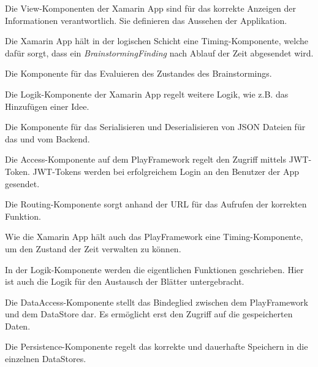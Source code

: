 \begin{description}[leftmargin=!,labelwidth=\widthof{\bfseries AppStateMachineComponent}]
	
	\item[ViewComponent] Die View-Komponenten der Xamarin App sind für das korrekte Anzeigen der Informationen verantwortlich. Sie definieren das Aussehen der Applikation.
	
	\item[AppTimingComponent] Die Xamarin App hält in der logischen Schicht eine Timing-Komponente, welche dafür sorgt, dass ein 
	\textit{BrainstormingFinding} nach Ablauf der Zeit abgesendet wird.
	
	\item[AppStateMachineComponent] Die Komponente für das Evaluieren des Zustandes des Brainstormings.
	
	\item[AppLogicComponent] Die Logik-Komponente der Xamarin App regelt weitere Logik, wie z.B. das Hinzufügen einer Idee.
	
	\item[AppDataAccessComponent] Die Komponente für das Serialisieren und Deserialisieren von JSON Dateien für das und vom Backend.
	
	\item[AccessComponent] Die Access-Komponente auf dem PlayFramework regelt den Zugriff mittels JWT-Token. JWT-Tokens werden bei erfolgreichem Login an den Benutzer der App gesendet. 
	
	\item[Routing] Die Routing-Komponente sorgt anhand der URL für das Aufrufen der korrekten Funktion.
	
	\item[TimingComponent] Wie die Xamarin App hält auch das PlayFramework eine Timing-Komponente, um den Zustand der Zeit verwalten zu können.
	
	\item[LogicComponent] In der Logik-Komponente werden die eigentlichen Funktionen geschrieben. Hier ist auch die Logik für den Austausch der Blätter untergebracht.
	
	\item[DataAccessComponent] Die DataAccess-Komponente stellt das Bindeglied zwischen dem PlayFramework und dem DataStore dar. Es ermöglicht erst den Zugriff auf die gespeicherten Daten.
	
	\item[PersistenceComponent] Die Persistence-Komponente regelt das korrekte und dauerhafte Speichern in die einzelnen DataStores.
\end{description}

